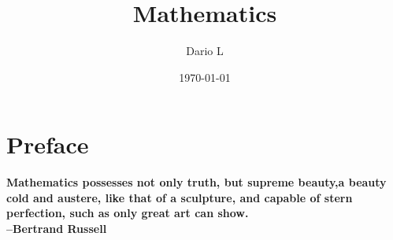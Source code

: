 \documentclass[a4paper,11pt]{book}
\author{Dario L}
\title{Mathematics}
\date{\today}
\begin{document}
\frontmatter
\maketitle

\chapter*{Preface}
\textbf{Mathematics possesses not only truth, but supreme beauty,a beauty cold and austere, like that of a sculpture,
and capable of stern perfection, such as only great art can show.\\ --Bertrand Russell}



\tableofcontents

\mainmatter



\end{document}
